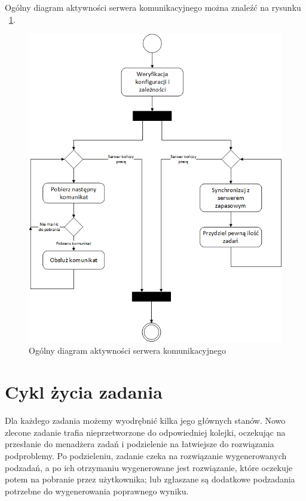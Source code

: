 \documentclass{report}
\begin{document}
	Ogólny diagram aktywności serwera komunikacyjnego można znaleźć na rysunku 
	~\ref{CommunicationServerGeneralActivity}.
	
	\begin{figure}
		\centering
		\includegraphics[width=\textwidth]{img/CommunicationServer-General.png}
		\caption{Ogólny diagram aktywności serwera komunikacyjnego}
		\label{CommunicationServerGeneralActivity}
	\end{figure}
	
\section{Cykl życia zadania}

	Dla każdego zadania możemy wyodrębnić kilka jego głównych stanów. Nowo zlecone zadanie
	trafia nieprzetworzone do odpowiedniej kolejki, oczekując na przesłanie do menadżera zadań
	i podzielenie na łatwiejsze do rozwiązania podproblemy. Po podzieleniu, zadanie czeka na rozwiązanie
	wygenerowanych podzadań, a po ich otrzymaniu wygenerowane jest rozwiązanie, które oczekuje potem na
	pobranie przez użytkownika; lub zgłaszane są dodatkowe podzadania potrzebne do wygenerowania poprawnego
	wyniku.
	
\end{document}

